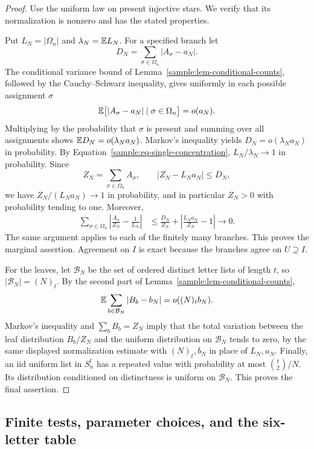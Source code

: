 \begin{proof}
Use the uniform law on present injective stars.  We verify that its
normalization is nonzero and has the stated properties.

Put $L_N=|\Omega_n|$ and $\lambda_N=\mathbb E L_N$.
For a specified branch let
\[
D_N=\sum_{\sigma\in\Omega_n}|A_\sigma-a_N|.
\]
The conditional variance bound of
Lemma~\ref{sample:lem-conditional-counts}, followed by the
Cauchy--Schwarz inequality, gives uniformly in each possible assignment
$\sigma$
\[
\mathbb E\bigl[|A_\sigma-a_N|\mid \sigma\in\Omega_n\bigr]=o(a_N).
\]
Multiplying by the probability that $\sigma$ is present and summing
over all assignments shows
$\mathbb E D_N=o(\lambda_Na_N)$.  Markov's inequality yields
$D_N=o(\lambda_Na_N)$ in probability.  By
Equation~\eqref{sample:eq-single-concentration},
$L_N/\lambda_N\to1$ in probability.  Since
\[
Z_N=\sum_{\sigma\in\Omega_n}A_\sigma,
\qquad |Z_N-L_Na_N|\leq D_N,
\]
we have $Z_N/(L_Na_N)\to1$ in probability, and in particular
$Z_N>0$ with probability tending to one.  Moreover,
\begin{align*}
\sum_{\sigma\in\Omega_n}
 \left|\frac{A_\sigma}{Z_N}-\frac1{L_N}\right|
&\leq \frac{D_N}{Z_N}
      +\left|\frac{L_Na_N}{Z_N}-1\right|
\longrightarrow0.
\end{align*}
The same argument applies to each of the finitely many branches.
This proves the marginal assertion.  Agreement on $I$ is exact because
the branches agree on $U\supseteq I$.

For the leaves, let $\mathcal B_N$ be the set of ordered distinct
letter lists of length $t$, so $|\mathcal B_N|=(N)_t$.  By the second
part of Lemma~\ref{sample:lem-conditional-counts},
\[
\mathbb E\sum_{b\in\mathcal B_N}|B_b-b_N|
       =o((N)_t b_N).
\]
Markov's inequality and $\sum_bB_b=Z_N$ imply that the total variation
between the leaf distribution $B_b/Z_N$ and the uniform distribution
on $\mathcal B_N$ tends to zero, by the same displayed normalization
estimate with $(N)_t,b_N$ in place of $L_N,a_N$.
Finally, an iid uniform list in $S_n^t$ has a repeated value with
probability at most $\binom t2/N$.  Its distribution conditioned on
distinctness is uniform on $\mathcal B_N$.  This proves the final
assertion.
\end{proof}

\subsection{Finite tests, parameter choices, and the six-letter table}

